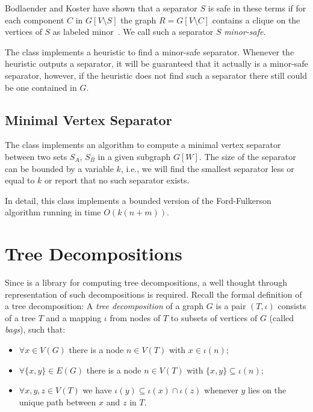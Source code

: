 \documentclass[a4paper, ukenglish, twoside, openright]{jdrasilmanual}
\begin{document}
Bodlaender and Koster have shown
that a separator \(S\) is safe in these terms if for each component
\(C\) in \(G[V\setminus S]\) the graph \(R=G[V\setminus C]\) contains
a clique on the vertices of \(S\) as labeled
minor~\cite{BodlaenderK2006}. We call such a separator \(S\)
\emph{minor-safe}.
 
The class  implements a heuristic to find a minor-safe
separator. Whenever the heuristic outputs a separator, it will be
guaranteed that it actually is a minor-safe separator, however, if the
heuristic does not find such a separator there still could be one
contained in \(G\).

\section{Minimal Vertex Separator}
The class  implements an algorithm to compute a minimal vertex
separator between two sets \(S_A\), \(S_B\) in a given subgraph
\(G[W]\). The size of the separator can be bounded by a variable
\(k\), i.e., we will find the smallest separator less or equal to
\(k\) or report that no such separator exists.
 
In detail, this class implements a bounded version of the
Ford-Fulkerson algorithm running in time \(O(k(n+m))\).

\chapter{Tree Decompositions}\label{chapter:treedecompositions}
Since \Jdrasil{} is a library for computing tree decompositions, a
well thought through representation of such decompositions is
required. Recall the formal definition of a tree decomposition: A
\emph{tree decomposition} of a graph $G$ is a pair $(T,\iota)$
consists of a tree $T$ and a mapping $\iota$ from nodes of $T$ to
subsets of vertices of $G$ (called \emph{bags}), such that:
\begin{itemize}
  \item $\forall x\in V(G)$ there is a node $n\in V(T)$ with $x\in\iota(n)$;
  \item $\forall \{x,y\}\in E(G)$ there is a node $n\in V(T)$ with $\{x,y\}\subseteq\iota(n)$;
  \item $\forall x,y,z\in V(T)$ we have $\iota(y)\subseteq \iota(x)\cap\iota(z)$
whenever $y$ lies on the unique path between $x$ and $z$ in $T$.
\end{itemize}
\end{document}
